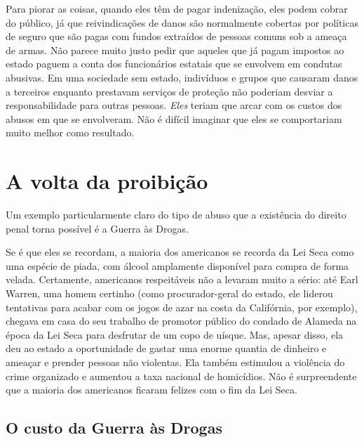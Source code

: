 Para piorar as coisas, quando eles têm de pagar indenização, eles podem cobrar do público, já que reivindicações de danos são normalmente cobertas por políticas de seguro que são pagas com fundos extraídos de pessoas comuns sob a ameaça de armas. Não parece muito justo pedir que aqueles que já pagam impostos ao estado paguem a conta dos funcionários estatais que se envolvem em condutas abusivas. Em uma sociedade sem estado, indivíduos e grupos que causaram danos a terceiros enquanto prestavam serviços de proteção não poderiam desviar a responsabilidade para outras pessoas. \emph{Eles} teriam que arcar com os custos dos abusos em que se envolveram. Não é difícil imaginar que eles se comportariam muito melhor como resultado.

\section{A volta da proibição}

Um exemplo particularmente claro do tipo de abuso que a existência do direito penal torna possível é a Guerra às Drogas.

Se é que eles se recordam, a maioria dos americanos se recorda da Lei Seca como uma espécie de piada, com álcool amplamente disponível para compra de forma velada. Certamente, americanos respeitáveis não a levaram muito a sério: até Earl Warren, uma homem certinho (como procurador-geral do estado, ele liderou tentativas para acabar com os jogos de azar na costa da Califórnia, por exemplo), chegava em casa do seu trabalho de promotor público do condado de Alameda na época da Lei Seca para desfrutar de um copo de uísque. Mas, apesar disso, ela deu ao estado a oportunidade de gastar uma enorme quantia de dinheiro e ameaçar e prender pessoas não violentas. Ela também estimulou a violência do crime organizado e aumentou a taxa nacional de homicídios. Não é surpreendente que a maioria dos americanos ficaram felizes com o fim da Lei Seca.

\subsection*{O custo da Guerra às Drogas}

